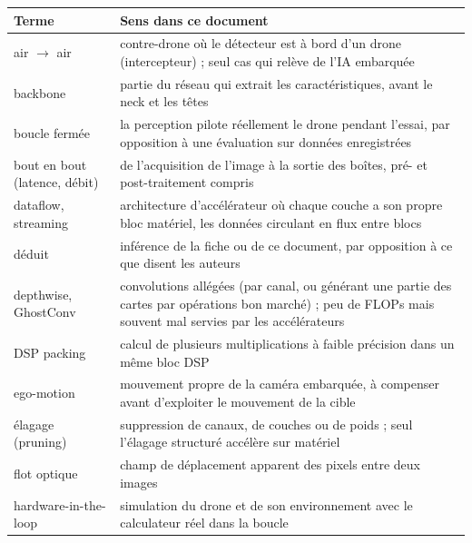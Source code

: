 {\small
\begin{longtable}{@{}>{\raggedright\arraybackslash}p{4.2cm}>{\raggedright\arraybackslash}p{\dimexpr\linewidth-4.2cm-2\tabcolsep\relax}@{}}
\toprule
Terme & Sens dans ce document \\
\midrule
\endhead
\leavevmode\hypertarget{gl:airair}{air $\rightarrow$ air} & contre-drone où le détecteur est à bord d'un drone (intercepteur) ; seul cas qui relève de l'IA embarquée \\
\leavevmode\hypertarget{gl:backbone}{backbone} & partie du réseau qui extrait les caractéristiques, avant le neck et les têtes \\
\leavevmode\hypertarget{gl:boucle}{boucle fermée} & la perception pilote réellement le drone pendant l'essai, par opposition à une évaluation sur données enregistrées \\
\leavevmode\hypertarget{gl:bout}{bout en bout (latence, débit)} & de l'acquisition de l'image à la sortie des boîtes, pré- et post-traitement compris \\
\leavevmode\hypertarget{gl:dataflow}{dataflow, streaming} & architecture d'accélérateur où chaque couche a son propre bloc matériel, les données circulant en flux entre blocs \\
\leavevmode\hypertarget{gl:deduit}{déduit} & inférence de la fiche ou de ce document, par opposition à ce que disent les auteurs \\
\leavevmode\hypertarget{gl:depthwise}{depthwise, GhostConv} & convolutions allégées (par canal, ou générant une partie des cartes par opérations bon marché) ; peu de FLOPs mais souvent mal servies par les accélérateurs \\
\leavevmode\hypertarget{gl:dsppacking}{DSP packing} & calcul de plusieurs multiplications à faible précision dans un même bloc DSP \\
\leavevmode\hypertarget{gl:egomotion}{ego-motion} & mouvement propre de la caméra embarquée, à compenser avant d'exploiter le mouvement de la cible \\
\leavevmode\hypertarget{gl:elagage}{élagage (pruning)} & suppression de canaux, de couches ou de poids ; seul l'élagage structuré accélère sur matériel \\
\leavevmode\hypertarget{gl:flot}{flot optique} & champ de déplacement apparent des pixels entre deux images \\
\leavevmode\hypertarget{gl:hil}{hardware-in-the-loop} & simulation du drone et de son environnement avec le calculateur réel dans la boucle \\

\end{longtable}}
